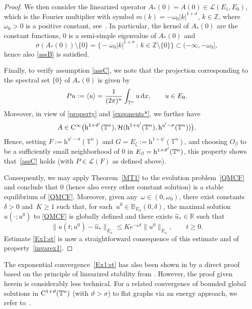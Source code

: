 \documentclass[reqno,11pt]{amsart}
\numberwithin{equation}{section}
\newcommand{\R}{\mathbb{R}}
\newcommand{\kL}{\mathcal{L}}
\theoremstyle{remark}
\begin{document}
\begin{proof}
 We  then consider the linearized operator $A_*(0)=A(0)\in\kL(E_1,E_0)$, which  is the Fourier multiplier with symbol $m(k)=-\omega_0|k|^{1+\sigma}$, $k\in\mathbb{Z}$, where  $\omega_0>0$ is a positive constant, see~\cite[Section~4]{MW_2025_Annali}. In particular, the kernel of $A_*(0)$ are the constant functions, $0$ is a semi-simple eigenvalue of $A_*(0)$ and 
\[
\sigma(A_*(0))\setminus\{0\}=\big\{-\omega_0|k|^{1+\sigma}\,:\, k\in\mathbb{Z}\setminus\{0\}\big\} \subset(-\infty, -\omega_0],
\] 
 hence also \eqref{assB} is satisfied.
 
 Finally, to verify  assumption \eqref{assC}, we note that the projection corresponding to the spectral set $\{0\}$ of $A_*(0)$ is given by
 \[
Pu:=\langle u\rangle =\frac{1}{(2\pi)^n}\int_{\mathbb{T}^n} u\,{\rm d}x,\qquad u\in E_0.
\]
Moreover, in view of \eqref{property} and \eqref{exponents*}, we  further have
\begin{equation*}
A\in{\rm C}^\infty\big({\rm h}^{1+\vartheta'}(\mathbb{T}^n), \mathcal{H}({\rm h}^{1+\eta'}(\mathbb{T}^n),   {\rm h}^{\eta'-\sigma}(\mathbb{T}^n))\big).
\end{equation*}
Hence, setting $F := \mathrm{h}^{\eta'-\sigma}(\mathbb{T}^n)$ and $G = E_\zeta := \mathrm{h}^{1+\eta'}(\mathbb{T}^n)$, and choosing 
$O_\beta$ to be a sufficiently small neighborhood of $0$ in $E_\beta={\rm h}^{1+\vartheta'}(\mathbb{T}^n)$, this property shows that~\eqref{assC}  holds (with $P\in\kL(F)$ as defined above).


 Consequently, we may  apply Theorem~\ref{MT1} to the evolution problem~\eqref{QMCF} and conclude that $0$ (hence also every other constant solution) is a stable equilibrium of \eqref{QMCF}. 
 Moreover,  given any~$\omega\in(0,\omega_0)$, there exist constants~$\delta>0$ and~$K\geq 1$ such that, for each~${u^0\in \mathbb{B}_{E_\alpha}(0,\delta)}$,  the maximal solution~$u(\cdot;u^0)$ to \eqref{QMCF} is globally defined and there exists $\hat u_*\in\R$ such that
\begin{equation*} 
\|u(t;u^0)-\hat u_*\|_{E_\alpha}\leq K e^{-\omega t}\|u^0\|_{E_\alpha},\qquad t\geq 0.
\end{equation*}
Estimate \eqref{Ex1:st} is now a straightforward consequence of this estimate and of property~\eqref{invarex1}.
\end{proof}


The exponential convergence~\eqref{Ex1:st}  has also been shown in \cite[Theorem~1.3]{MW_2025_Annali} by a direct proof based on the principle of linearized stability from  \cite[Theorem~1.3]{MW20}. However, the proof given herein is considerably less technical.
For a related convergence of bounded global solutions in 
${\rm C}^{1+\vartheta}(\mathbb{T}^n)$ (with $\vartheta>\sigma$) to flat graphs via an energy approach,  we refer to~\cite{CN24}.\medskip
\end{document}
